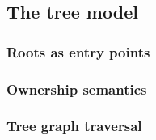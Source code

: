 
\subsection{The tree model}

\subsubsection{Roots as entry points}

\subsubsection{Ownership semantics}

\subsubsection{Tree graph traversal}
